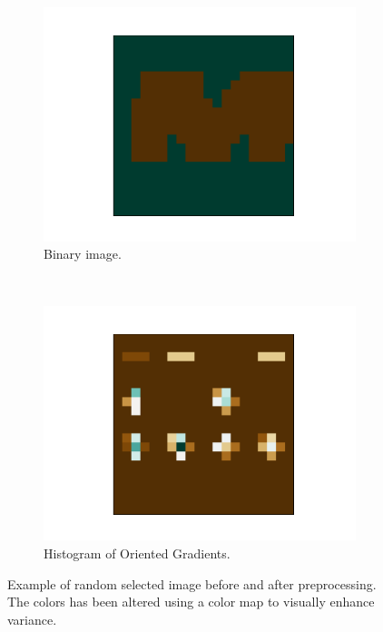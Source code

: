 \documentclass[../main.tex]{subfiles}
\begin{document}
\begin{figure}
    ~ %
    \begin{subfigure}[t]{0.2\textwidth}
        \includegraphics[width=\textwidth]{figures/pp/img_to_bool.pdf}
        \caption{Binary image.}
        \label{fig:bool}
    \end{subfigure}
        ~ %
    \begin{subfigure}[t]{0.2\textwidth}
        \includegraphics[width=\textwidth]{figures/pp/hog.pdf}
        \caption{Histogram of Oriented Gradients.}
        \label{fig:hog}
    \end{subfigure}
    \caption{Example of random selected image before and after preprocessing. The colors has been altered using a color map to visually enhance variance.}\label{fig:pp_image}
\end{figure}
\end{document}
